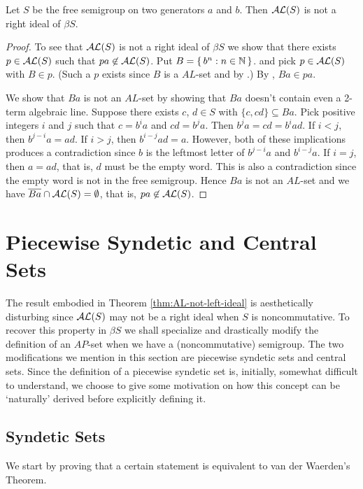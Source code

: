 \begin{thm}
  \label{thm:AL-not-left-ideal}
  Let $S$ be the free semigroup on two generators $a$ and $b$.
  Then $\mathcal{AL}(S)$ is not a right ideal of $\beta S$.
\end{thm}
\begin{proof}
  To see that $\mathcal{AL}(S)$ is not a right ideal of $\beta S$ we show that there exists $p \in \mathcal{AL}(S)$ such that $pa \not\in \mathcal{AL}(S)$. 
  Put $B = \{\, b^n : n \in \mathbb{N} \,\}$. and pick $p \in \mathcal{AL}(S)$ with $B \in p$. 
  (Such a $p$ exists since $B$ is a $AL$-set and by \cite[Theorem 3.11]{Hindman:1998fk}.)
  By \cite[Exercise 4.1.8(b)]{Hindman:1998fk}, $Ba \in pa$. 

  We show that $Ba$ is not an $AL$-set by showing that $Ba$ doesn't contain even a 2-term algebraic line. 
  Suppose there exists $c$, $d \in S$ with $\{c, cd\} \subseteq Ba$. 
  Pick positive integers $i$ and $j$ such that $c = b^ia$ and $cd = b^ja$.
  Then $b^ja = cd = b^iad$.
  If $i < j$, then $b^{j-i}a = ad$.
  If $i > j$, then $b^{i-j}ad = a$.
  However, both of these implications produces a contradiction since $b$ is the leftmost letter of $b^{j-i}a$ and $b^{i-j}a$.
  If $i = j$, then $a = ad$, that is, $d$ must be the empty word.
  This is also a contradiction since the empty word is not in the free semigroup.
  Hence $Ba$ is not an $AL$-set and we have $\overline{Ba} \cap \mathcal{AL}(S) = \emptyset$, that is, $pa \not\in \mathcal{AL}(S)$. 
\end{proof}

\section{Piecewise Syndetic and Central Sets}
The result embodied in Theorem \ref{thm:AL-not-left-ideal} is aesthetically disturbing since $\mathcal{AL}(S)$ may not be a right ideal when $S$ is noncommutative. 
To recover this property in $\beta S$ we shall specialize and drastically modify the definition of an $AP$-set when we have a (noncommutative) semigroup.
The two modifications we mention in this section are piecewise syndetic sets and central sets.
Since the definition of a piecewise syndetic set is, initially, somewhat difficult to understand, we choose to give some motivation on how this concept can be `naturally' derived before explicitly defining it.


\subsection{Syndetic Sets}
We start by proving that a certain statement is equivalent to van der Waerden's Theorem.

